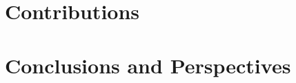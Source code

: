 % 

\part{Contributions}\label{part:contributions}


% 

\part{Conclusions and Perspectives}\label{part:conclusion}



\pagebreak

\makeatletter
\renewenvironment{thebibliography}[1]
     {\chapter*{\bibname}%
      \@mkboth{\MakeUppercase\bibname}{\MakeUppercase\bibname}%
      \list{\@biblabel{\@arabic\c@enumiv}}%
           {\settowidth\labelwidth{\@biblabel{#1}}%
            \leftmargin\labelwidth
            \advance\leftmargin\labelsep
            \@openbib@code
            \usecounter{enumiv}%
            \let\p@enumiv\@empty
            \renewcommand\theenumiv{\@arabic\c@enumiv}}%
      \sloppy
      \clubpenalty4000
      \@clubpenalty \clubpenalty
      \widowpenalty4000%
      \sfcode`\.\@m}
     {\def\@noitemerr
       {\@latex@warning{Empty `thebibliography' environment}}%
      \endlist}
\makeatother

{}


\newif\ifapp
\apptrue %

\newif\ifpapers

